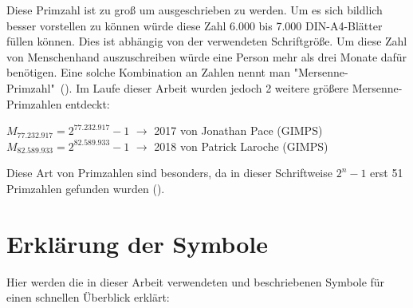\documentclass[12pt,a4paper]{article}
\theoremstyle{definition}
\begin{document}
Diese Primzahl ist zu groß um ausgeschrieben zu werden.
Um es sich bildlich besser vorstellen zu können würde diese Zahl 6.000 bis 7.000 DIN-A4-Blätter füllen können.
Dies ist abhängig von der verwendeten Schriftgröße.
Um diese Zahl von Menschenhand auszuschreiben würde eine Person mehr als drei Monate dafür benötigen.
Eine solche Kombination an Zahlen nennt man "Mersenne-Primzahl"\ (\cite{TheNewYorkTimes2016}).
Im Laufe dieser Arbeit wurden jedoch 2 weitere größere Mersenne-Primzahlen entdeckt:
\begin{center}
$M_{77.232.917} = 2^{77.232.917}-1$ $\rightarrow$ 2017 von Jonathan Pace (GIMPS)\\
$M_{82.589.933} = 2^{82.589.933}-1$ $\rightarrow$ 2018 von Patrick Laroche (GIMPS)
\end{center}

Diese Art von Primzahlen sind besonders, da in dieser Schriftweise $2^n-1$ erst 51 Primzahlen gefunden wurden (\cite{ListederMersennePrimzahlen2020}).
\newpage

\tableofcontents
\thispagestyle{empty}
\newpage

\section*{Erklärung der Symbole}
Hier werden die in dieser Arbeit verwendeten und beschriebenen Symbole für einen schnellen Überblick erklärt:
\end{document}

